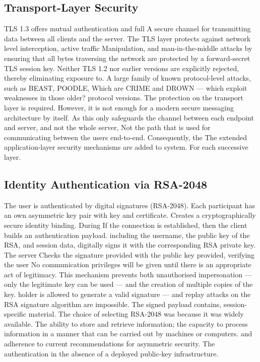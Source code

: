 \documentclass[conference]{IEEEtran}
\begin{document}
\subsection{Transport-Layer Security}

TLS 1.3 offers mutual authentication and full
A secure channel for transmitting data between all clients and the server.  The
TLS layer protects against network level interception, active traffic
Manipulation, and man-in-the-middle attacks by ensuring that all bytes
traversing the network are protected by a forward-secret TLS session key.
Neither TLS 1.2 nor earlier versions are explicitly rejected, thereby eliminating exposure to.
A large family of known protocol-level attacks, such as BEAST, POODLE,
Which are CRIME and DROWN — which exploit weaknesses in those older?
protocol versions.  The protection on the transport layer is required.
However, it is not enough for a modern secure messaging architecture by itself.
As this only safeguards the channel between each endpoint and server, and not the whole server,
Not the path that is used for communicating between the users end-to-end.  Consequently, the
The extended application-layer security mechanisms are added to system.
For each successive layer.

\subsection{Identity Authentication via RSA-2048}

The user is authenticated by digital signatures (RSA-2048).
Each participant has an own asymmetric key pair with key and certificate.
Creates a cryptographically secure identity binding.  During
If the connection is established, then the client builds an authentication payload.
including the username, the public key of the RSA, and session data,
digitally signs it with the corresponding RSA private key.  The server
Checks the signature provided with the public key provided, verifying the user
No communication privileges will be given until there is an appropriate act of legitimacy.  This mechanism
prevents both unauthorised impersonation — only the legitimate key can be used — and the creation of multiple copies of the key.
holder is allowed to generate a valid signature — and replay attacks on the RSA signature algorithm are impossible.
The signed payload contains,
session-specific material.  The choice of selecting RSA-2048 was because it was widely available.
The ability to store and retrieve information; the capacity to process information in a manner that can be carried out by machines or computers.
and adherence to current recommendations for asymmetric security.
The authentication in the absence of a deployed public-key infrastructure.
\end{document}
